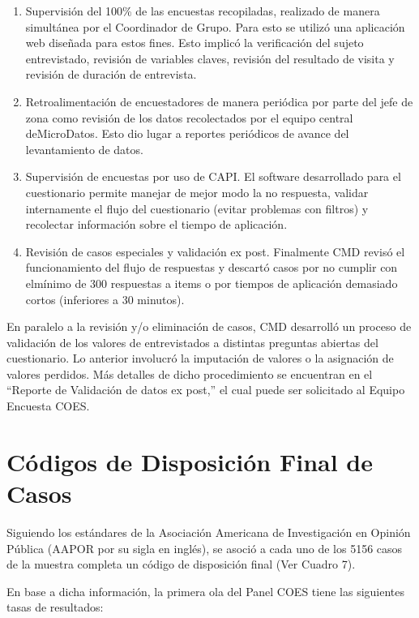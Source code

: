 \documentclass[
]{book}
\begin{document}
\begin{enumerate}
\def\labelenumi{\arabic{enumi}.}
\item
  Supervisión del 100\% de las encuestas recopiladas, realizado de manera simultánea por el Coordinador de Grupo. Para esto se utilizó una aplicación web diseñada para estos fines. Esto implicó la verificación del sujeto entrevistado, revisión de variables claves, revisión del resultado de visita y revisión de duración de entrevista.
\item
  Retroalimentación de encuestadores de manera periódica por parte del jefe de zona como revisión de los datos recolectados por el equipo central deMicroDatos. Esto dio lugar a reportes periódicos de avance del levantamiento de datos.
\item
  Supervisión de encuestas por uso de CAPI. El software desarrollado para el cuestionario
  permite manejar de mejor modo la no respuesta, validar internamente el flujo del
  cuestionario (evitar problemas con filtros) y recolectar información sobre el tiempo de
  aplicación.
\item
  Revisión de casos especiales y validación ex post. Finalmente CMD revisó el funcionamiento del flujo de respuestas y descartó casos por no cumplir con elmínimo de 300 respuestas a items o por tiempos de aplicación demasiado cortos (inferiores a 30 minutos).
\end{enumerate}

En paralelo a la revisión y/o eliminación de casos, CMD desarrolló un proceso de validación de los valores de entrevistados a distintas preguntas abiertas del cuestionario. Lo anterior involucró la imputación de valores o la asignación de valores perdidos. Más detalles de dicho procedimiento se encuentran en el ``Reporte de Validación de datos ex post,'' el cual puede ser solicitado al Equipo Encuesta COES.

\hypertarget{cuxf3digos-de-disposiciuxf3n-final-de-casos}{%
\section{Códigos de Disposición Final de Casos}\label{cuxf3digos-de-disposiciuxf3n-final-de-casos}}

Siguiendo los estándares de la Asociación Americana de Investigación en Opinión Pública (AAPOR por su sigla en inglés), se asoció a cada uno de los 5156 casos de la muestra completa un código de disposición final (Ver Cuadro 7).

En base a dicha información, la primera ola del Panel COES tiene las siguientes tasas de resultados:
\end{document}
